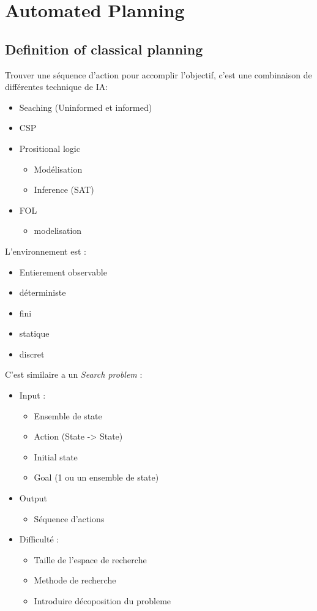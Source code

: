 \documentclass[12pt]{article}
\begin{document}
			
\newpage
\section{Automated Planning}
	\subsection{Definition of classical planning}
		Trouver une séquence d'action pour accomplir l'objectif, c'est une combinaison de différentes technique de IA:
		\begin{itemize}
			\item Seaching (Uninformed et informed)
			\item CSP
			\item Prositional logic
			\begin{itemize}
				\item Modélisation
				\item Inference (SAT)
			\end{itemize}
			\item FOL
			\begin{itemize}
				\item modelisation
			\end{itemize}
		\end{itemize}
		
		L'environnement est :
		\begin{itemize}
			\item Entierement observable
			\item déterministe 
			\item fini
			\item statique
			\item discret
		\end{itemize}
		
		C'est similaire a un \textit{Search problem} :
		\begin{itemize}
			\item Input :
			\begin{itemize}
				\item Ensemble de state
				\item Action (State -> State)
				\item Initial state
				\item Goal (1 ou un ensemble de state)
			\end{itemize}
			\item Output
				\begin{itemize}
					\item Séquence d'actions
				\end{itemize}
				
			\item Difficulté : 
				\begin{itemize}
					\item Taille de l'espace de recherche
					\item Methode de recherche
					\item Introduire décoposition du probleme
				\end{itemize}
		\end{itemize}
		
\end{document}
